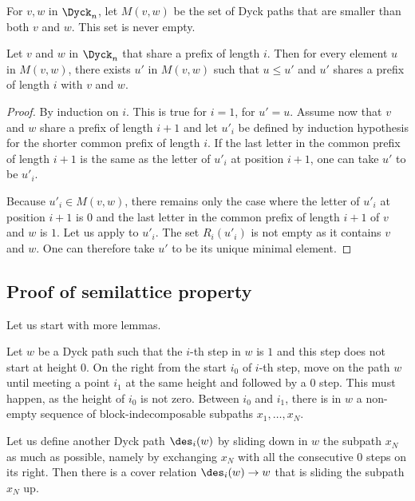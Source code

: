 %

For $v,w$ in $\Dyck_n$, let $M(v,w)$ be the set of Dyck paths that are
smaller than both $v$ and $w$. This set is never empty.

\begin{lemma}
  \label{meet_with_prefix}
  Let $v$ and $w$ in $\Dyck_n$ that share a prefix of length $i$. Then
  for every element $u$ in $M(v,w)$, there exists $u'$ in $M(v,w)$
  such that $u \leq u'$ and $u'$ shares a prefix of length $i$ with $v$
  and $w$.
\end{lemma}
\begin{proof}
  By induction on $i$. This is true for $i=1$, for $u'=u$. Assume now
  that $v$ and $w$ share a prefix of length $i+1$ and let $u'_i$
  be defined by induction hypothesis for the shorter common prefix of
  length $i$. If the last letter in the common prefix of length $i+1$
  is the same as the letter of $u'_i$ at position $i+1$, one can take
  $u'$ to be $u'_i$.

  Because $u'_i \in M(v,w)$, there remains only the case where the
  letter of $u'_i$ at position $i+1$ is $0$ and the last letter in the
  common prefix of length $i+1$ of $v$ and $w$ is $1$. Let us apply
   to $u'_i$. The set $R_{i}(u'_i)$ is not empty as
  it contains $v$ and $w$. One can therefore take $u'$ to be its unique
  minimal element.
\end{proof}

\subsection{Proof of semilattice property}

\label{proof_semi}

Let us start with more lemmas.

Let $w$ be a Dyck path such that the $i$-th step in $w$ is $1$ and
this step does not start at height $0$.  On the right from the start
$i_0$ of $i$-th step, move on the path $w$ until meeting a point $i_1$
at the same height and followed by a $0$ step. This must happen, as
the height of $i_0$ is not zero. Between $i_0$ and $i_1$, there is in
$w$ a non-empty sequence of block-indecomposable subpaths $x_1, \dots, x_N$.

Let us define another Dyck path $\des_i(w)$ by sliding down in $w$ the
subpath $x_N$ as much as possible, namely by exchanging $x_N$ with all
the consecutive $0$ steps on its right. Then there is a cover relation
$\des_i(w) \to w$ that is sliding the subpath $x_N$ up.

